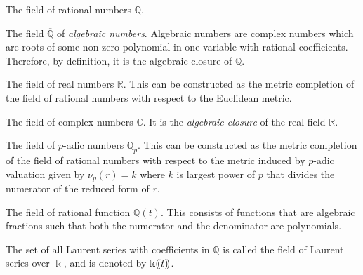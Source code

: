 \documentclass[a4paper, 12pt]{book} %
\begin{document}
\begin{example}
The field of rational numbers $\mathbb{Q}$.
\end{example}

\begin{example}
The field $\overline{\mathbb{Q}}$ of \emph{algebraic numbers}. Algebraic numbers  are complex numbers which are roots of some non-zero polynomial in one variable with rational coefficients. Therefore, by definition, it is the algebraic closure of $\mathbb{Q}$. 
\end{example}

\begin{example}
The field of real numbers $\mathbb{R}$. This can be constructed as the metric completion of the field of rational numbers with respect to the Euclidean metric.
\end{example}

\begin{example}
The field of complex numbers $\mathbb{C}$. It is the \emph{algebraic closure} of the real field $\mathbb{R}$.
\end{example}

\begin{example}
The field of $p$-adic numbers $\overline{\mathbb{Q}}_p$. This can be constructed as the metric completion of the field of rational numbers with respect to the metric induced by $p$-adic valuation given by $\nu_p(r) = k$ where $k$ is largest power of $p$ that divides the numerator of the reduced form of $r$. 
\end{example}

\begin{example}
The field of rational function $\mathbb{Q}(t)$. This consists of functions that are algebraic fractions such that both the numerator and the denominator are polynomials. 
\end{example}
    
\begin{example}
The set of all Laurent series with coefficients in $\mathbb{Q}$ is called the field of Laurent series over $\Bbbk$, and is denoted by $\Bbbk(\kern-.2em(t)\kern-.2em)$.
\end{example}
\end{document}
